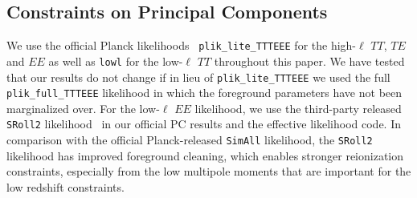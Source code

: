 \documentclass[prd,twocolumn,amsmath,amssymb,floatfix,superscriptaddress,nofootinbib]{revtex4-1}
\begin{document}
\subsection{Constraints on Principal Components}
We use the official Planck likelihoods~\cite{Aghanim:2019ame} \texttt{plik\_lite\_TTTEEE} for the high-$\ell$ $TT$, $TE$ and $EE$ as well as \texttt{lowl} for the low-$\ell$ $TT$ throughout this paper. We have tested that our results do not change if in lieu of \texttt{plik\_lite\_TTTEEE} we used the full \texttt{plik\_full\_TTTEEE} likelihood in which the foreground parameters have not been marginalized over. For the low-$\ell$ $EE$ likelihood, we use the third-party released \texttt{SRoll2} likelihood~\cite{Delouis:2019bub} in our official PC results and the effective likelihood code. In comparison with the official Planck-released \texttt{SimAll} likelihood, the \texttt{SRoll2} likelihood has improved foreground cleaning, 
which enables stronger reionization constraints, especially from the low multipole moments that are important for the low redshift constraints.
\end{document}
